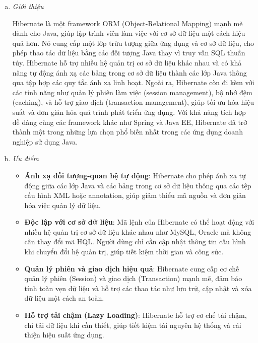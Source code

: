 \begin{enumerate}[(a)]
\end{enumerate}

\begin{enumerate}[(a)]
	\item \textit{Giới thiệu}

	      Hibernate là một framework ORM (Object-Relational Mapping) mạnh mẽ dành cho Java, giúp lập trình viên làm việc với cơ sở dữ liệu một cách hiệu quả hơn. Nó cung cấp một lớp trừu tượng giữa ứng dụng và cơ sở dữ liệu, cho phép thao tác dữ liệu bằng các đối tượng Java thay vì truy vấn SQL thuần túy. Hibernate hỗ trợ nhiều hệ quản trị cơ sở dữ liệu khác nhau và có khả năng tự động ánh xạ các bảng trong cơ sở dữ liệu thành các lớp Java thông qua tập hợp các quy tắc ánh xạ linh hoạt. Ngoài ra, Hibernate còn đi kèm với các tính năng như quản lý phiên làm việc (session management), bộ nhớ đệm (caching), và hỗ trợ giao dịch (transaction management), giúp tối ưu hóa hiệu suất và đơn giản hóa quá trình phát triển ứng dụng. Với khả năng tích hợp dễ dàng cùng các framework khác như Spring và Java EE, Hibernate đã trở thành một trong những lựa chọn phổ biến nhất trong các ứng dụng doanh nghiệp sử dụng Java.

	\item \textit{Ưu điểm}

	      \begin{itemize}
		      \item \textbf{Ánh xạ đối tượng-quan hệ tự động}: Hibernate cho phép ánh xạ tự động giữa các lớp Java và các bảng trong cơ sở dữ liệu thông qua các tệp cấu hình XML hoặc annotation, giúp giảm thiểu mã nguồn và đơn giản hóa việc quản lý dữ liệu.
		      \item \textbf{Độc lập với cơ sở dữ liệu}: Mã lệnh của Hibernate có thể hoạt động với nhiều hệ quản trị cơ sở dữ liệu khác nhau như MySQL, Oracle mà không cần thay đổi mã HQL. Người dùng chỉ cần cập nhật thông tin cấu hình khi chuyển đổi hệ quản trị, giúp tiết kiệm thời gian và công sức.
		      \item \textbf{Quản lý phiên và giao dịch hiệu quả}: Hibernate cung cấp cơ chế quản lý phiên (Session) và giao dịch (Transaction) mạnh mẽ, đảm bảo tính toàn vẹn dữ liệu và hỗ trợ các thao tác như lưu trữ, cập nhật và xóa dữ liệu một cách an toàn.
		      \item \textbf{Hỗ trợ tải chậm (Lazy Loading)}: Hibernate hỗ trợ cơ chế tải chậm, chỉ tải dữ liệu khi cần thiết, giúp tiết kiệm tài nguyên hệ thống và cải thiện hiệu suất ứng dụng.


\end{itemize}
\end{enumerate}
